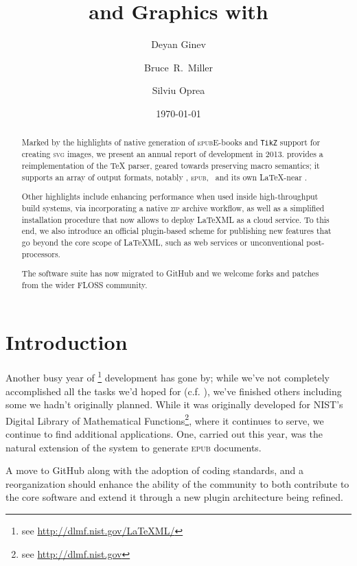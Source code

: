 \documentclass{llncs}
\title{\ebooks and Graphics with \LaTeXML}
\author{Deyan Ginev\inst{1} \and Bruce~R.~Miller\inst{2} \and Silviu Oprea\inst{3}}
\institute{Computer Science, Jacobs University Bremen, Germany
 \and National Institute of Standards and Technology, Gaithersburg, MD, USA
 \and Department of Computer Science, University of Oxford, Oxford, UK}
\date{\today}
\def\ebooks{\mbox{E-books}\xspace}
\def\epub{\textsc{epub}\xspace}
\def\svg{\textsc{svg}\xspace}
\def\zip{\textsc{zip}\xspace}
\def\tikz{\texttt{TikZ}\xspace}
\begin{document}
\maketitle
\begin{abstract} 
Marked by the highlights of native generation of \epub \ebooks and \tikz support for creating \svg images, we present an annual report of {\LaTeXML} development in 2013. {\LaTeXML} provides a reimplementation of the {\TeX} parser, geared towards preserving macro semantics;
it supports an array of output formats, notably , \epub, \XHTML\ and its own \LaTeX-near \XML.

Other highlights include enhancing performance when used inside high-throughput build systems, via incorporating a native \zip archive workflow, as well as a simplified installation procedure that now allows to deploy LaTeXML as a cloud service. To this end, we also introduce an official plugin-based scheme for publishing new features that go beyond the core scope of LaTeXML, such as web services or unconventional post-processors.

The software suite has now migrated to GitHub and we welcome forks and patches from the wider FLOSS community.
\end{abstract}

\section{Introduction}
Another busy year of {\LaTeXML} \footnote{see \url{http://dlmf.nist.gov/LaTeXML/}} development has gone by;
while we've not completely accomplished all the tasks we'd hoped for (c.f. \cite{GinMil:latexmlCICM13}),
we've finished others including some we hadn't originally planned.
While it was originally developed for NIST's Digital Library of Mathematical Functions\footnote{see \url{http://dlmf.nist.gov}},
where it continues to serve, we continue to find additional applications.
One, carried out this year, was the natural extension of the system to generate \epub documents. 

A move to GitHub along with
the adoption of coding standards, and a reorganization should enhance
the ability of the community to both contribute to the core software
and extend it through a new plugin architecture being refined.
\end{document}
